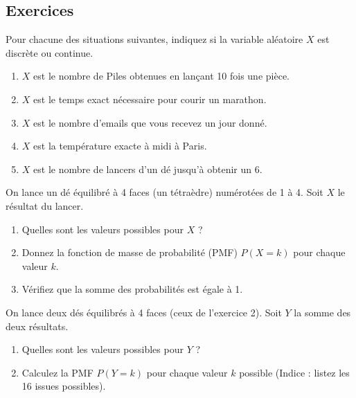 \subsection{Exercices}


\begin{exercicebox}
Pour chacune des situations suivantes, indiquez si la variable aléatoire $X$ est discrète ou continue.
\begin{enumerate}
    \item $X$ est le nombre de Piles obtenues en lançant 10 fois une pièce.
    \item $X$ est le temps exact nécessaire pour courir un marathon.
    \item $X$ est le nombre d'emails que vous recevez un jour donné.
    \item $X$ est la température exacte à midi à Paris.
    \item $X$ est le nombre de lancers d'un dé jusqu'à obtenir un 6.
\end{enumerate}
\end{exercicebox}

\begin{exercicebox}
On lance un dé équilibré à 4 faces (un tétraèdre) numérotées de 1 à 4. Soit $X$ le résultat du lancer.
\begin{enumerate}
    \item Quelles sont les valeurs possibles pour $X$ ?
    \item Donnez la fonction de masse de probabilité (PMF) $P(X=k)$ pour chaque valeur $k$.
    \item Vérifiez que la somme des probabilités est égale à 1.
\end{enumerate}
\end{exercicebox}

\begin{exercicebox}
On lance deux dés équilibrés à 4 faces (ceux de l'exercice 2). Soit $Y$ la somme des deux résultats.
\begin{enumerate}
    \item Quelles sont les valeurs possibles pour $Y$ ?
    \item Calculez la PMF $P(Y=k)$ pour chaque valeur $k$ possible (Indice : listez les 16 issues possibles).
\end{enumerate}
\end{exercicebox}

